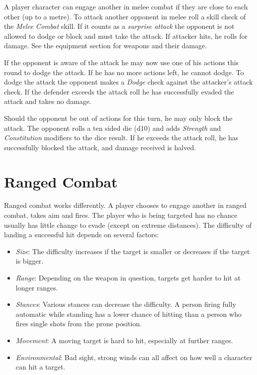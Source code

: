 A player character can engage another in melee combat if they are close to each
other (up to a metre). To attack another opponent in melee roll a skill check
of the \emph{Melee Combat} skill. If it counts as a \emph{surprise attack} the
opponent is not allowed to dodge or block and must take the attack. If attacker
hits, he rolls for damage. See the equipment section for weapons and their
damage.

If the opponent is aware of the attack he may now use one of his actions this
round to dodge the attack. If he has no more actions left, he cannot dodge. To
dodge the attack the opponent makes a \emph{Dodge} check against the attacker's
attack check. If the defender exceeds the attack roll he has successfully evaded
the attack and takes no damage.

Should the opponent be out of actions for this turn, he may only block the
attack. The opponent rolls a ten sided die (d10) and adds \emph{Strength} and
\emph{Constitution} modifiers to the dice result. If he exceeds the attack roll,
he has successfully blocked the attack, and damage received is halved.

\section{Ranged Combat}
\label{sec:7-Ranged Combat}

Ranged combat works differently. A player chooses to engage another in ranged
combat, takes aim and fires. The player who is being targeted has no chance
usually has little change to evade (except on extreme distances). The difficulty
of landing a successful hit depends on several factors:

\begin{itemize}
\item \emph{Size}: The difficulty increases if the target is smaller or
  decreases if the target is bigger.
\item \emph{Range}: Depending on the weapon in question, targets get harder to
  hit at longer ranges.
\item \emph{Stances}: Various stances can decrease the difficulty. A person
  firing fully automatic while standing has a lower chance of hitting than a
  person who fires single shots from the prone position.
\item \emph{Movement}: A moving target is hard to hit, especially at further
  ranges.
\item \emph{Environmental}: Bad sight, strong winds can all affect on how well
  a character can hit a target.
\end{itemize}

